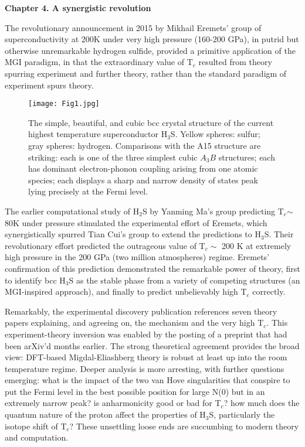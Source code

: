 \documentclass[aps,prb,twocolumn,groupedaddress]{revtex4}
\begin{document}
\begin{center}{\bf Chapter 4. A synergistic revolution} \end{center}

The revolutionary announcement in 2015 by Mikhail Eremets' group\cite{Eremets} 
of superconductivity at 200K under very high pressure (160-200 GPa), in 
putrid but otherwise unremarkable hydrogen sulfide, provided a primitive 
application of the MGI paradigm, in that the extraordinary value of T$_c$ 
resulted from theory spurring experiment and further theory, rather than the
standard paradigm of experiment spurs theory. 

\begin{figure}[!ht]
\texttt{[image: Fig1.jpg]}
\caption{
The simple, beautiful, and cubic bcc crystal structure of the current
highest temperature superconductor H$_3$S. Yellow spheres: sulfur;
gray spheres: hydrogen. Comparisons with the A15 structure
are striking: each is one of the three simplest cubic $A_3B$ 
structures; each has dominant
electron-phonon coupling arising from one atomic species; 
each displays a sharp and narrow density
of states peak lying precisely at the Fermi level. 
}
\label{Structure}
\end{figure}


The earlier computational study of H$_2$S by Yanming Ma's group\cite{Ma} predicting 
T$_c$$\sim$80K under pressure stimulated the experimental effort of Eremets, 
which synergistically spurred Tian Cui's group to extend the predictions\cite{Cui} to 
H$_3$S. Their revolutionary effort predicted the outrageous value of T$_c\sim$ 200 K 
at extremely high pressure in the 200 GPa (two million atmospheres) regime.  Eremets' 
confirmation of this prediction demonstrated the remarkable power of theory, 
first to identify bcc H$_3$S as the stable phase from a variety of competing structures
(an MGI-inspired approach), 
and finally to predict unbelievably high T$_c$ correctly. 

Remarkably, 
the experimental discovery publication\cite{Eremets} references seven theory 
papers explaining, and agreeing on, the mechanism and the very high 
T$_c$. This experiment-theory inversion was enabled by the posting of a preprint
that had been arXiv'd months earlier.\cite{arXiv} 
The strong theoretical agreement provides
the broad view: DFT-based Migdal-Eliashberg theory is robust at least up into
the room temperature regime. Deeper analysis is more arresting, with further 
questions emerging: what is the impact of the two van Hove singularities that 
conspire to put the Fermi level in the best possible position for large N(0) 
but in an extremely narrow peak? is anharmonicity good or bad for T$_c$? how 
much does the quantum nature of the proton affect the properties of H$_3$S, 
particularly the isotope shift of T$_c$? These unsettling loose ends are succumbing to
modern theory and computation. 
\end{document}
